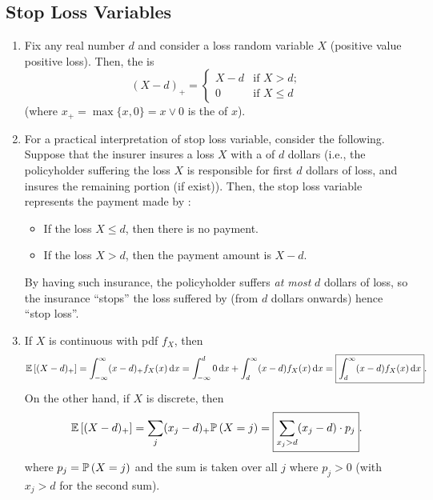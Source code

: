 \subsection{Stop Loss Variables}
\begin{enumerate}
\item Fix any real number \(d\) and consider a loss  random
variable \(X\) (positive value  positive loss).  Then, the
 is 
\[
(X-d)_{+}=\begin{cases}
X-d&\text{if }X> d;\\
0&\text{if }X\le d
\end{cases}
\]
(where \(x_{+}=\max\{x,0\}=x\vee 0\) is the  of \(x\)).

\item For a practical interpretation of stop loss variable, consider the
following. Suppose that the insurer  insures a loss \(X\) with
a  of \(d\) dollars (i.e., the policyholder 
suffering the loss \(X\) is responsible for first \(d\) dollars of loss, and
 insures the remaining portion (if exist)). Then, the stop
loss variable represents the payment made by :
\begin{itemize}
\item If the loss \(X\le d\), then there is no payment.
\item If the loss \(X>d\), then the payment amount is \(X-d\).
\end{itemize}
\begin{note}
By having such insurance, the policyholder  suffers \emph{at most}
\(d\) dollars of loss, so the insurance ``stops'' the loss suffered by
 (from \(d\) dollars onwards)  hence ``stop
loss''.
\end{note}

\item \label{it:stop-loss-direct-exp-fmlas}
If \(X\) is continuous with pdf \(f_X\), then
\[
\mathbb{E}\left[(X-d)_{+}\right]=\int_{-\infty}^{\infty}(x-d)_{+}f_X(x)\dd{x}
=\int_{-\infty}^{d}0\dd{x}+\int_{d}^{\infty}(x-d)f_X(x)\dd{x}
=\boxed{\int_{d}^{\infty}(x-d)f_X(x)\dd{x}}.
\]
On the other hand, if \(X\) is discrete, then
\[
\mathbb{E}\left[(X-d)_{+}\right]=\sum_{j}^{}(x_j-d)_{+}\mathbb{P}\left(X=j\right)
=\boxed{\sum_{x_j>d}^{}(x_j-d)\cdot p_j}.
\]
where \(p_j=\mathbb{P}\left(X=j\right)\) and the sum is taken over all \(j\) where \(p_j>0\)
(with \(x_j>d\) for the second sum).


\end{enumerate}
